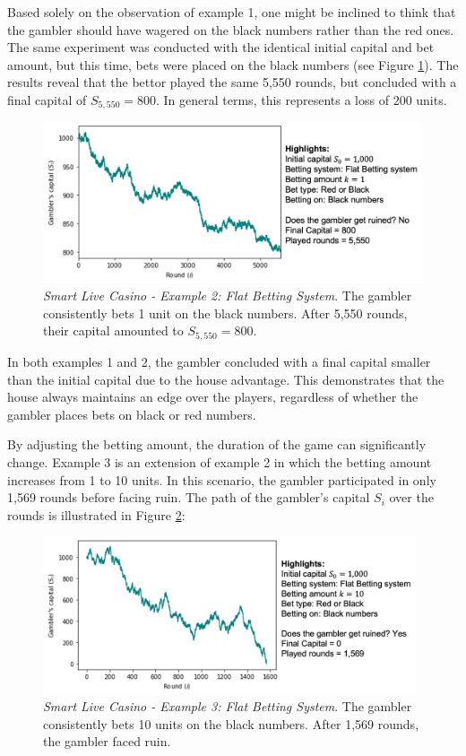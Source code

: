 \documentclass[11pt,twoside]{article}
\numberwithin{Theorem}{section}
\numberwithin{Definition}{section}
\numberwithin{Lemma}{section}
\numberwithin{Algorithm}{section}
\numberwithin{equation}{section}
\begin{document}
Based solely on the observation of example 1, one might be inclined to think that the gambler should have wagered on the black numbers rather than the red ones. The same experiment was conducted with the identical initial capital and bet amount, but this time, bets were placed on the black numbers (see Figure \ref{sim_live_02}). The results reveal that the bettor played the same 5,550 rounds, but concluded with a final capital of $S_{5,550} = 800$. In general terms, this represents a loss of 200 units.

\begin{figure}[H]
    \centering
    \includegraphics[width=11 cm]{sim_02.png}
    \caption[Smart Live Casino - Example 2: Flat Betting System]{\textit{Smart Live Casino - Example 2: Flat Betting System}. The gambler consistently bets 1 unit on the black numbers. After 5,550 rounds, their capital amounted to $S_{5,550} = 800$. }\label{sim_live_02}
\end{figure}
In both examples 1 and 2, the gambler concluded with a final capital smaller than the initial capital due to the house advantage. This demonstrates that the house always maintains an edge over the players, regardless of whether the gambler places bets on black or red numbers.

By adjusting the betting amount, the duration of the game can  significantly change. Example 3 is an extension of example 2 in which the betting amount increases from 1 to 10 units. In this scenario, the gambler participated in only 1,569 rounds before facing ruin. The path of the gambler's capital $S_{i}$ over the rounds is illustrated in Figure \ref{sim_live_03}:

\begin{figure}[H]
    \centering
    \includegraphics[width=11cm]{sim_03.png}
    \caption[Smart Live Casino - Example 3: Flat Betting System]{\textit{Smart Live Casino - Example 3: Flat Betting System}. The gambler consistently bets 10 units on the black numbers. After 1,569 rounds, the gambler faced ruin. }\label{sim_live_03}
\end{figure}
\end{document}

